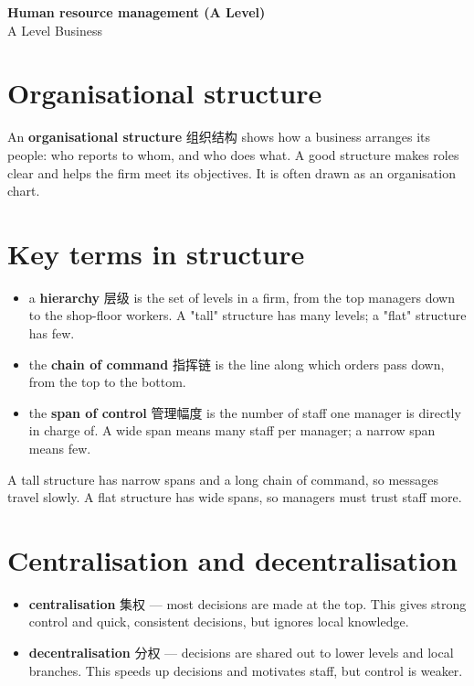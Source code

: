 \documentclass[11pt]{article}
\begin{document}
\begin{center}
  {\LARGE\bfseries Human resource management (A Level)}\\[0.35em]
  {\large A Level Business}
\end{center}
\vspace{0.6em}

\section*{Organisational structure}

An \textbf{organisational structure} 组织结构 shows how a business arranges its people: who reports to whom, and who does what. A good structure makes roles clear and helps the firm meet its objectives. It is often drawn as an organisation chart.

\section*{Key terms in structure}

\begin{itemize}
\item a \textbf{hierarchy} 层级 is the set of levels in a firm, from the top managers down to the shop-floor workers. A "tall" structure has many levels; a "flat" structure has few.

\item the \textbf{chain of command} 指挥链 is the line along which orders pass down, from the top to the bottom.

\item the \textbf{span of control} 管理幅度 is the number of staff one manager is directly in charge of. A wide span means many staff per manager; a narrow span means few.

\end{itemize}

A tall structure has narrow spans and a long chain of command, so messages travel slowly. A flat structure has wide spans, so managers must trust staff more.

\section*{Centralisation and decentralisation}

\begin{itemize}
\item \textbf{centralisation} 集权 — most decisions are made at the top. This gives strong control and quick, consistent decisions, but ignores local knowledge.

\item \textbf{decentralisation} 分权 — decisions are shared out to lower levels and local branches. This speeds up decisions and motivates staff, but control is weaker.

\end{itemize}
\end{document}

